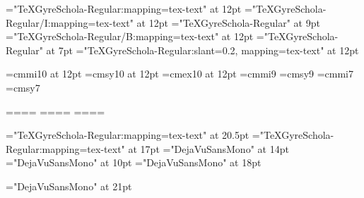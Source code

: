 
\font\tenrm="TeXGyreSchola-Regular:mapping=tex-text" at 12pt     \font\tenit="TeXGyreSchola-Regular/I:mapping=tex-text" at 12pt
\font\sevenrm="TeXGyreSchola-Regular" at 9pt                     \font\tenbf="TeXGyreSchola-Regular/B:mapping=tex-text" at 12pt
\font\fiverm="TeXGyreSchola-Regular" at 7pt                      \font\tensl="TeXGyreSchola-Regular:slant=0.2, mapping=tex-text" at 12pt

\font\teni=cmmi10 at 12pt    \font\tensy=cmsy10 at 12pt    \font\tenex=cmex10 at 12pt
\font\seveni=cmmi9           \font\sevensy=cmsy9
\font\fivei=cmmi7            \font\fivesy=cmsy7

=\tenrm              {}=\teni             {}=\tensy             {}=\tenex
{}=\sevenrm          {}=\seveni         {}=\sevensy         {}=\tenex
{}=\fiverm     {}=\fivei    {}=\fivesy    {}=\tenex

\font\fencp="TeXGyreSchola-Regular:mapping=tex-text" at 20.5pt
\font\fencs="TeXGyreSchola-Regular:mapping=tex-text" at 17pt
\font\fcode="DejaVuSansMono" at 14pt
\font\fsup="DejaVuSansMono" at 10pt
\font\fcomilla="DejaVuSansMono" at 18pt

\newcount\cap {}
\newcount\subcap
\font\festrella="DejaVuSansMono" at 21pt
\def\estrella{{\festrella\indent\lower0.5ex \hbox{*}}}
\def\super#1{{\fsup \raise1ex \hbox{#1}}}
\def\espenc{\hskip0.2em}
\def\inst#1#2{{\fcode#1\super{#2}}}
\def\encabezadop#1{\advance\cap by 1\vskip20pt\noindent{\fencp\hskip.3em \the\cap.\espenc #1}\vskip8pt \subcap=1}
\def\encabezados#1{\vskip16pt\noindent{\fencs\hskip.2em \the\cap.\the\subcap.\espenc #1}\vskip7pt \advance\subcap by 1}

\rm
\hsize=6.1in \vsize=24cm
\hoffset=0.11in
\baselineskip=15pt \parindent=14pt


